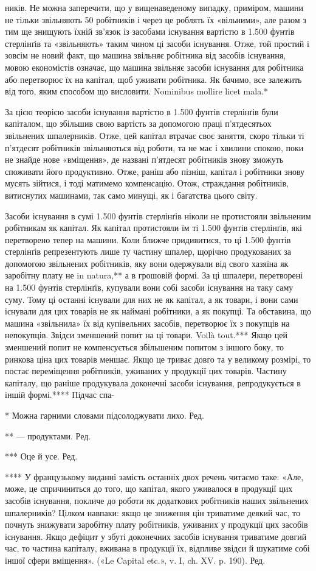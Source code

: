 ників. Не можна заперечити, що у вищенаведеному випадку,
приміром, машини не тільки звільняють 50 робітників і через це
роблять їх «вільними», але разом з тим ще знищують їхній зв’язок
із засобами існування вартістю в 1.500 фунтів стерлінґів та
«звільняють» таким чином ці засоби існування. Отже, той простий
і зовсім не новий факт, що машина звільняє робітника від
засобів існування, мовою економістів означає, що машина звільняє
засоби існування для робітника або перетворює їх на капітал,
щоб уживати робітника. Як бачимо, все залежить від того, яким
способом що висловити. Nominibus mollire licet mala.*

За цією теорією засоби існування вартістю в 1.500 фунтів
стерлінґів були капіталом, що збільшив свою вартість за допомогою
праці п’ятдесятьох звільнених шпалерників. Отже, цей
капітал втрачає своє заняття, скоро тільки ті п’ятдесят робітників
звільняються від роботи, та не має і хвилини спокою, поки
не знайде нове «вміщення», де названі п’ятдесят робітників
знову зможуть споживати його продуктивно. Отже, раніш або
пізніш, капітал і робітники знову мусять зійтися, і тоді матимемо
компенсацію. Отож, страждання робітників, витиснутих машинами,
так само минущі, як і багатства цього світу.

Засоби існування в сумі 1.500 фунтів стерлінґів ніколи не протистояли
звільненим робітникам як капітал. Як капітал протистояли
їм ті 1.500 фунтів стерлінґів, які перетворено тепер на
машини. Коли ближче придивитися, то ці 1.500 фунтів стерлінґів
репрезентують лише ту частину шпалер, щорічно продукованих
за допомогою звільнених робітників, яку вони одержували
від свого хазяїна як заробітну плату не in natura,** а в грошовій
формі. За ці шпалери, перетворені на 1.500 фунтів стерлінґів,
купували вони собі засоби існування на таку саму суму. Тому ці
останні існували для них не як капітал, а як товари, і вони сами
існували для цих товарів не як наймані робітники, а як покупці.
Та обставина, що машина «звільнила» їх від купівельних засобів,
перетворює їх з покупців на непокупців. Звідси зменшений
попит на ці товари. Voilà tout.*** Якщо цей зменшений попит не
компенсується збільшеним попитом з іншого боку, то ринкова
ціна цих товарів меншає. Якщо це триває довго та у великому
розмірі, то постає переміщення робітників, уживаних у продукції
цих товарів. Частину капіталу, що раніше продукувала доконечні
засоби існування, репродукується в іншій формі.**** Підчас спа-

* Можна гарними словами підсолоджувати лихо. Ред.

** — продуктами. Ред.

*** Оце й усе. Ред.

**** У французькому виданні замість останніх двох речень читаємо
таке: «Але, може, це спричиниться до того, що капітал, якого уживалося
в продукції цих засобів існування, покличе до роботи як додаткових
робітників наших звільнених шпалерників? Цілком навпаки: якщо це
зниження цін триватиме деякий час, то почнуть знижувати заробітну плату
робітників, уживаних у продукції цих засобів існування. Якщо дефіцит
у збуті доконечних засобів існування триватиме довгий час, то частина
капіталу, вживана в продукції їх, відпливе звідси й шукатиме собі іншої
сфери вміщення». («Le Capital etc.», v. I, ch. XV. p. 190). Ред.
